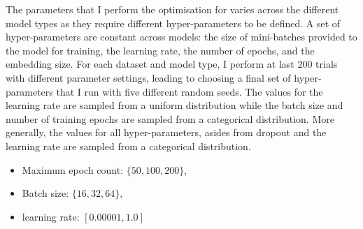 The parameters that I perform the optimisation for varies across the different model types as they require different hyper-parameters to be defined. A set of hyper-parameters are constant across models: the size of mini-batches provided to the model for training, the learning rate, the number of epochs, and the embedding size. For each dataset and model type, I perform at last $200$ trials with different parameter settings, leading to choosing a final set of hyper-parameters that I run with five different random seeds.
The values for the learning rate are sampled from a uniform distribution while the batch size and number of training epochs are sampled from a categorical distribution. More generally, the values for all hyper-parameters, asides from dropout and the learning rate are sampled from a categorical distribution.

\begin{itemize}
  \item Maximum epoch count: $\{50, 100, 200\}$,
  \item Batch size: $\{16, 32, 64\}$,
  \item learning rate: $[0.00001, 1.0]$
\end{itemize}

